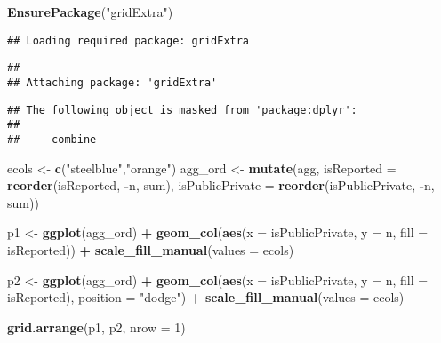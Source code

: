 \documentclass[]{article}
\newenvironment{Shaded}{\begin{snugshade}}{\end{snugshade}}
\newcommand{\DataTypeTok}[1]{\textcolor[rgb]{0.13,0.29,0.53}{#1}}
\newcommand{\DecValTok}[1]{\textcolor[rgb]{0.00,0.00,0.81}{#1}}
\newcommand{\KeywordTok}[1]{\textcolor[rgb]{0.13,0.29,0.53}{\textbf{#1}}}
\newcommand{\NormalTok}[1]{#1}
\newcommand{\OperatorTok}[1]{\textcolor[rgb]{0.81,0.36,0.00}{\textbf{#1}}}
\newcommand{\StringTok}[1]{\textcolor[rgb]{0.31,0.60,0.02}{#1}}
\begin{document}
\begin{Shaded}
\begin{Highlighting}[]
\KeywordTok{EnsurePackage}\NormalTok{(}\StringTok{"gridExtra"}\NormalTok{)}
\end{Highlighting}
\end{Shaded}

\begin{verbatim}
## Loading required package: gridExtra
\end{verbatim}

\begin{verbatim}
## 
## Attaching package: 'gridExtra'
\end{verbatim}

\begin{verbatim}
## The following object is masked from 'package:dplyr':
## 
##     combine
\end{verbatim}

\begin{Shaded}
\begin{Highlighting}[]
\NormalTok{ecols <-}\StringTok{ }\KeywordTok{c}\NormalTok{(}\StringTok{"steelblue"}\NormalTok{,}\StringTok{"orange"}\NormalTok{)}
\NormalTok{agg_ord <-}\StringTok{ }\KeywordTok{mutate}\NormalTok{(agg, }
                  \DataTypeTok{isReported =} \KeywordTok{reorder}\NormalTok{(isReported, }\OperatorTok{-}\NormalTok{n, sum),}
                  \DataTypeTok{isPublicPrivate =} \KeywordTok{reorder}\NormalTok{(isPublicPrivate, }\OperatorTok{-}\NormalTok{n, sum))}

\NormalTok{p1 <-}\StringTok{ }\KeywordTok{ggplot}\NormalTok{(agg_ord) }\OperatorTok{+}
\StringTok{      }\KeywordTok{geom_col}\NormalTok{(}\KeywordTok{aes}\NormalTok{(}\DataTypeTok{x =}\NormalTok{ isPublicPrivate, }\DataTypeTok{y =}\NormalTok{ n, }\DataTypeTok{fill =}\NormalTok{ isReported)) }\OperatorTok{+}
\StringTok{      }\KeywordTok{scale_fill_manual}\NormalTok{(}\DataTypeTok{values =}\NormalTok{ ecols)}

\NormalTok{p2 <-}\StringTok{ }\KeywordTok{ggplot}\NormalTok{(agg_ord) }\OperatorTok{+}
\StringTok{      }\KeywordTok{geom_col}\NormalTok{(}\KeywordTok{aes}\NormalTok{(}\DataTypeTok{x =}\NormalTok{ isPublicPrivate, }\DataTypeTok{y =}\NormalTok{ n, }\DataTypeTok{fill =}\NormalTok{ isReported), }\DataTypeTok{position =} \StringTok{"dodge"}\NormalTok{) }\OperatorTok{+}
\StringTok{      }\KeywordTok{scale_fill_manual}\NormalTok{(}\DataTypeTok{values =}\NormalTok{ ecols)}

\KeywordTok{grid.arrange}\NormalTok{(p1, p2, }\DataTypeTok{nrow =} \DecValTok{1}\NormalTok{)}
\end{Highlighting}
\end{Shaded}
\end{document}
